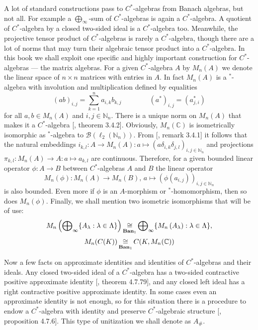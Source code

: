 A lot of standard constructions pass to $C^*$-algebras from Banach algebras, but
not all. For example a $\bigoplus_\infty$-sum of $C^*$-algebras is again a
$C^*$-algebra. A quotient of $C^*$-algebra by a closed two-sided ideal is a
$C^*$-algebra too. Meanwhile, the projective tensor product of $C^*$-algebras is
rarely a $C^*$-algebra, though there are a lot of norms that may turn their
algebraic tensor product into a $C^*$-algebra. In this book we shall exploit one
specific and highly important construction for $C^*$-algebras --- the matrix
algebras. For a given $C^*$-algebra $A$ by $M_n(A)$ we denote the linear space
of $n\times n$ matrices with entries in $A$. In fact $M_n(A)$ is a ${}^*$-algebra
with involution and multiplication defined by equalities 
$$
{(ab)}_{i,j}=\sum_{k=1}^n a_{i,k}b_{k,j}
\qquad\qquad
{(a^*)}_{i,j}=(a_{j,i}^*)
$$ 
for all $a,b\in M_n(A)$ and $i,j\in\mathbb{N}_n$. There is a unique norm on
$M_n(A)$ that makes it a $C^*$-algebra [\cite{MurphyCStarAlgsAndOpTh}, theorem
3.4.2]. Obviously, $M_n(\mathbb{C})$ is isometrically isomorphic as
${}^*$-algebra to $\mathcal{B}(\ell_2(\mathbb{N}_n))$. From
[\cite{MurphyCStarAlgsAndOpTh}, remark 3.4.1] it follows that the natural
embeddings 
$i_{k,l}:A\to M_n(A):a\mapsto{(a\delta_{i,k}\delta_{j,l})}_{i,j\in\mathbb{N}_n}$
and projections
$\pi_{k,l}:M_n(A)\to A:a\mapsto a_{k,l}$ are continuous. Therefore, for a given
bounded linear operator $\phi:A\to B$ between $C^*$-algebras $A$ and $B$ the
linear operator 
$$
M_n(\phi):M_n(A)\to M_n(B),\, a\mapsto {(\phi(a_{i,j}))}_{i,j\in\mathbb{N}_n}
$$ 
is also bounded. Even more if $\phi$ is an $A$-morphism or ${}^*$-homomorphism,
then so does $M_n(\phi)$. Finally, we shall mention two isometric isomorphisms
that will be of use:
$$
M_n\left(\bigoplus\nolimits_\infty \{A_\lambda:\lambda\in\Lambda \}\right)
\mathop{\mathbin{\cong}}\limits_{\mathbf{Ban}_1}
\bigoplus\nolimits_\infty \{M_n\left(A_\lambda\right):\lambda\in\Lambda \},
$$
$$
M_n(C(K))\mathop{\mathbin{\cong}}\limits_{\mathbf{Ban}_1}C(K,M_n(\mathbb{C}))
$$

Now a few facts on approximate identities and identities of $C^*$-algebras and
their ideals. Any closed two-sided ideal of a $C^*$-algebra has a two-sided
contractive positive approximate identity [\cite{HelBanLocConvAlg}, theorem
4.7.79], and any closed left ideal has a right contractive positive approximate
identity. In some cases even an approximate identity is not enough, so for this
situation there is a procedure to endow a $C^*$-algebra with identity and
preserve $C^*$-algebraic structure [\cite{HelBanLocConvAlg}, proposition 4.7.6].
This type of unitization we shall denote as $A_\#$. 

